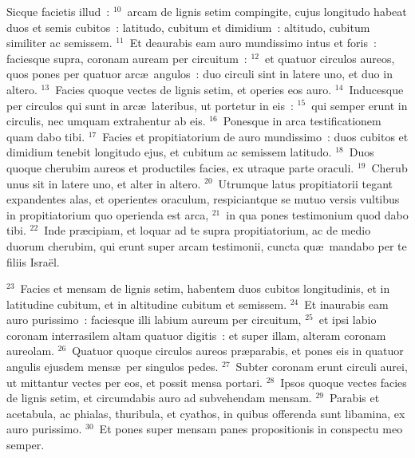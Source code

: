  Sicque facietis illud~:
${}^{10}$~arcam de lignis setim compingite, cujus longitudo habeat duos et semis cubitos~: latitudo, cubitum et dimidium~: altitudo, cubitum similiter ac semissem.
${}^{11}$~Et deaurabis eam auro mundissimo intus et foris~: faciesque supra, coronam auream per circuitum~:
${}^{12}$~et quatuor circulos aureos, quos pones per quatuor arc\ae\ angulos~: duo circuli sint in latere uno, et duo in altero.
${}^{13}$~Facies quoque vectes de lignis setim, et operies eos auro.
${}^{14}$~Inducesque per circulos qui sunt in arc\ae\ lateribus, ut portetur in eis~:
${}^{15}$~qui semper erunt in circulis, nec umquam extrahentur ab eis.
${}^{16}$~Ponesque in arca testificationem quam dabo tibi.
${}^{17}$~Facies et propitiatorium de auro mundissimo~: duos cubitos et dimidium tenebit longitudo ejus, et cubitum ac semissem latitudo.
${}^{18}$~Duos quoque cherubim aureos et productiles facies, ex utraque parte oraculi.
${}^{19}$~Cherub unus sit in latere uno, et alter in altero.
${}^{20}$~Utrumque latus propitiatorii tegant expandentes alas, et operientes oraculum, respiciantque se mutuo versis vultibus in propitiatorium quo operienda est arca,
${}^{21}$~in qua pones testimonium quod dabo tibi.
${}^{22}$~Inde pr\ae cipiam, et loquar ad te supra propitiatorium, ac de medio duorum cherubim, qui erunt super arcam testimonii, cuncta qu\ae\ mandabo per te filiis Isra\"el.


${}^{23}$~Facies et mensam de lignis setim, habentem duos cubitos longitudinis, et in latitudine cubitum, et in altitudine cubitum et semissem.
${}^{24}$~Et inaurabis eam auro purissimo~: faciesque illi labium aureum per circuitum,
${}^{25}$~et ipsi labio coronam interrasilem altam quatuor digitis~: et super illam, alteram coronam aureolam.
${}^{26}$~Quatuor quoque circulos aureos pr\ae parabis, et pones eis in quatuor angulis ejusdem mens\ae\ per singulos pedes.
${}^{27}$~Subter coronam erunt circuli aurei, ut mittantur vectes per eos, et possit mensa portari.
${}^{28}$~Ipsos quoque vectes facies de lignis setim, et circumdabis auro ad subvehendam mensam.
${}^{29}$~Parabis et acetabula, ac phialas, thuribula, et cyathos, in quibus offerenda sunt libamina, ex auro purissimo.
${}^{30}$~Et pones super mensam panes propositionis in conspectu meo semper.


